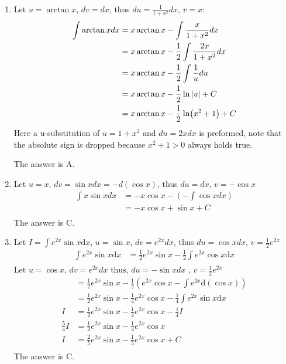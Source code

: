 \documentclass{article}
\numberwithin{equation}{section}
\begin{document}
\begin{enumerate}
    \item Let $u = \arctan x$, $dv = dx$, thus $du = \frac{1}{1+x^2} dx$, $v=x$:
    \begin{align*}
        \int \arctan x dx &= x\arctan x - \int \frac{x}{1+x^2}dx\\
        &= x\arctan x - \frac{1}{2}\int \frac{2x}{1+x^2} dx\\
        &= x\arctan x - \frac{1}{2} \int \frac{1}{u} du\\
        &= x\arctan x - \frac{1}{2} \ln \abs{u} +C\\
        &= x\arctan x - \frac{1}{2} \ln (x^2+1)+C\\
    \end{align*}
    Here a u-substitution of $u = 1+x^2$ and $du = 2x dx$ is preformed, note that the absolute sign is dropped because $x^2 + 1 > 0$ always holds true.

    The answer is A.

    \item Let $u = x$, $dv = \sin x dx = -d(\cos x)$, thus $du = dx$, $v = -\cos x$
    \begin{align*}
        \int x\sin x dx &= -x\cos x - \left(-\int \cos x dx\right)\\
        &= -x\cos x + \sin x +C\\
    \end{align*}
    The answer is C.

    \item Let $\displaystyle I = \int e^{2x} \sin x \mathrm{d}x$, $u = \sin x$, $dv = e^{2x} dx$, thus $du = \cos x dx$, $v = \frac{1}{2}e^{2x}$
    \begin{align*}
        \int e^{2x} \sin x \mathrm{d}x & = \frac{1}{2} e^{2x} \sin x - \frac{1}{2} \int e^{2x} \cos x \mathrm{d}x \\
    \end{align*}
    $\text{Let } u=\cos x \text{, } dv = e^{2x}dx \text{ thus, } du = -\sin x dx \text{ , } v = \frac{1}{2}e^{2x}$
    \begin{align*}
        & = \frac{1}{2} e^{2x} \sin x - \frac{1}{2}\left(e^{2x} \cos x -\int e^{2x} \mathrm{d}(\cos x)\right) \\
        & = \frac{1}{2} e^{2x} \sin x - \frac{1}{4} e^{2x} \cos x -\frac{1}{4}\int e^{2x} \sin x \mathrm{d}x \\
        I & = \frac{1}{2} e^{2x} \sin x - \frac{1}{4} e^{2x} \cos x -\frac{1}{4}I \\
        \frac{5}{4} I & = \frac{1}{2} e^{2x} \sin x - \frac{1}{4} e^{2x} \cos x \\
        I & =  \frac{2}{5} e^{2x} \sin x - \frac{1}{5} e^{2x} \cos x + C \\
    \end{align*}
    The answer is C.


\end{enumerate}
\end{document}
